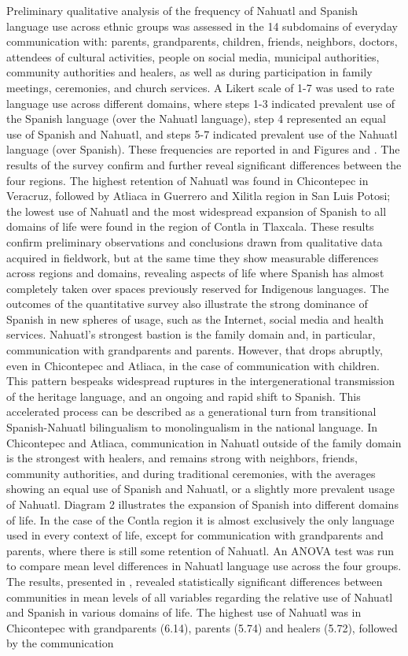\documentclass[output=paper,hidelinks]{langscibook}
\begin{document}
Preliminary qualitative analysis of the frequency of Nahuatl and Spanish language use across ethnic groups was assessed in the 14 subdomains of everyday communication with: parents, grandparents, children, friends, neighbors, doctors, attendees of cultural activities, people on social media, municipal authorities, community authorities and healers, as well as during participation in family meetings, ceremonies, and church services. A Likert scale of 1-7 was used to rate language use across different domains, where steps 1-3 indicated prevalent use of the Spanish language (over the Nahuatl language), step 4 represented an equal use of Spanish and Nahuatl, and steps 5-7 indicated prevalent use of the Nahuatl language (over Spanish). These frequencies are reported in  and Figures  and . The results of the survey confirm and further reveal significant differences between the four regions. The highest retention of Nahuatl was found in Chicontepec in Veracruz, followed by Atliaca in Guerrero and Xilitla region in San Luis Potosi; the lowest use of Nahuatl and the most widespread expansion of Spanish to all domains of life were found in the region of Contla in Tlaxcala. These results confirm preliminary observations and conclusions drawn from qualitative data acquired in fieldwork, but at the same time they show measurable differences across regions and domains, revealing aspects of life where Spanish has almost completely taken over spaces previously reserved for Indigenous languages. The outcomes of the quantitative survey also illustrate the strong dominance of Spanish in new spheres of usage, such as the Internet, social media and health services. Nahuatl’s strongest bastion is the family domain and, in particular, communication with grandparents and parents. However, that drops abruptly, even in Chicontepec and Atliaca, in the case of communication with children. This pattern bespeaks widespread ruptures in the intergenerational transmission of the heritage language, and an ongoing and rapid shift to Spanish. This accelerated process can be described as a generational turn from transitional Spanish-Nahuatl bilingualism to monolingualism in the national language. In Chicontepec and Atliaca, communication in Nahuatl outside of the family domain is the strongest with healers, and remains strong with neighbors, friends, community authorities, and during traditional ceremonies, with the averages showing an equal use of Spanish and Nahuatl, or a slightly more prevalent usage of Nahuatl. Diagram 2 illustrates the expansion of Spanish into different domains of life. In the case of the Contla region it is almost exclusively the only language used in every context of life, except for communication with grandparents and parents, where there is still some retention of Nahuatl. An ANOVA test was run to compare mean level differences in Nahuatl language use across the four groups. The results, presented in , revealed statistically significant differences between communities in mean levels of all variables regarding the relative use of Nahuatl and Spanish in various domains of life. The highest use of Nahuatl was in Chicontepec with grandparents (6.14), parents (5.74) and healers (5.72), followed by the communication 
\end{document}
